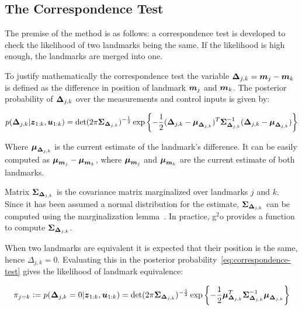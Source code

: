 \subsection{The Correspondence Test}

The premise of the method is as follows: a correspondence test is developed to check the likelihood of two landmarks being the same. If the likelihood is high enough, the landmarks are merged into one. 

To justify mathematically the correspondence test the variable $\boldsymbol{\Delta}_{j,k}=\boldsymbol{m}_j-\boldsymbol{m}_k$ is defined as the difference in position of landmark $\boldsymbol{m}_j$ and $\boldsymbol{m}_k$. The posterior probability of $\boldsymbol{\Delta}_{j,k}$ over the measurements and control inputs is given by:

\begin{equation}
p(\boldsymbol{\Delta}_{j,k}|\boldsymbol{z}_{1:k},\boldsymbol{u}_{1:k})=
\det(2\pi \boldsymbol{\Sigma}_{\boldsymbol{\Delta}_{j,k}})^{-\frac{1}{2}}\exp\left\lbrace -\frac{1}{2}(\boldsymbol{\Delta}_{j,k}-\boldsymbol{\mu}_{\boldsymbol{\Delta}_{j,k}})^T
\boldsymbol{\Sigma}_{\boldsymbol{\Delta}_{j,k}}^{-1}(\boldsymbol{\Delta}_{j,k}-\boldsymbol{\mu}_{\boldsymbol{\Delta}_{j,k}})\right\rbrace
\label{eq:correspondence-test}
\end{equation}

Where $\boldsymbol{\mu}_{\boldsymbol{\Delta}_{j,k}}$ is the current estimate of the landmark's difference. It can be easily computed as $\boldsymbol{\mu}_{\boldsymbol{m}_j}-\boldsymbol{\mu}_{\boldsymbol{m}_k}$, where $\boldsymbol{\mu}_{\boldsymbol{m}_j}$ and $\boldsymbol{\mu}_{\boldsymbol{m}_k}$ are the current estimate of both landmarks.

Matrix $\boldsymbol{\Sigma}_{\boldsymbol{\Delta}_{j,k}}$ is the covariance matrix marginalized over landmarks $j$ and $k$. Since it has been assumed a normal distribution for the estimate, $\boldsymbol{\Sigma}_{\boldsymbol{\Delta}_{j,k}}$ can be computed using the marginalization lemma~\cite{graphslam}. In practice, g$^2$o provides a function to compute $\boldsymbol{\Sigma}_{\boldsymbol{\Delta}_{j,k}}$.


When two landmarks are equivalent it is expected that their position is the same, hence $\Delta_{j,k}=0$. Evaluating this in the posterior probability~\eqref{eq:correspondence-test} gives the likelihood of landmark equivalence:

\begin{equation}
\pi_{j=k} \vcentcolon=
p(\boldsymbol{\Delta}_{j,k}=0|\boldsymbol{z}_{1:k},\boldsymbol{u}_{1:k})=
\det(2\pi\boldsymbol{\Sigma}_{\boldsymbol{\Delta}_{j,k}})^{-\frac{1}{2}}
\exp\left\lbrace-\frac{1}{2}\boldsymbol{\mu}_{\boldsymbol{\Delta}_{j,k}}^T\boldsymbol{\Sigma}_{\boldsymbol{\Delta}_{j,k}}^{-1}\boldsymbol{\mu}_{\boldsymbol{\Delta}_{j,k}}\right\rbrace
\end{equation}

